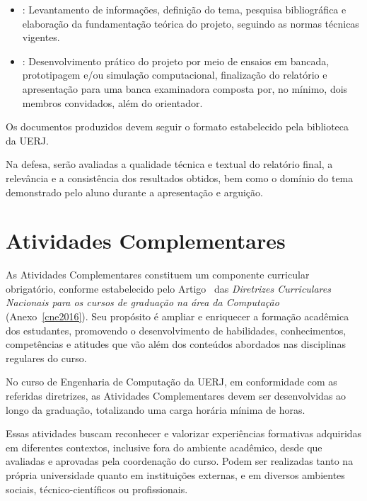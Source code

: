 \begin{itemize}
    \item \textbf{\ProjA}: Levantamento de informações, definição do tema, pesquisa bibliográfica e elaboração da fundamentação teórica do projeto, seguindo as normas técnicas vigentes.
    \item \textbf{\ProjB}: Desenvolvimento prático do projeto por meio de ensaios em bancada, prototipagem e/ou simulação computacional, finalização do relatório e apresentação para uma banca examinadora composta por, no mínimo, dois membros convidados, além do orientador.
\end{itemize}

Os documentos produzidos devem seguir o formato estabelecido pela biblioteca da UERJ.

Na defesa, serão avaliadas a qualidade técnica e textual do relatório final, a relevância e a consistência dos resultados obtidos, bem como o domínio do tema demonstrado pelo aluno durante a apresentação e arguição.


\section{Atividades Complementares}

As Atividades Complementares constituem um componente curricular obrigatório, conforme estabelecido pelo Artigo~ das \textit{Diretrizes Curriculares Nacionais para os cursos de graduação na área da Computação} (Anexo~\ref{cne2016}). Seu propósito é ampliar e enriquecer a formação acadêmica dos estudantes, promovendo o desenvolvimento de habilidades, conhecimentos, competências e atitudes que vão além dos conteúdos abordados nas disciplinas regulares do curso.

No curso de Engenharia de Computação da UERJ, em conformidade com as referidas diretrizes, as Atividades Complementares devem ser desenvolvidas ao longo da graduação, totalizando uma carga horária mínima de \hACC horas.

Essas atividades buscam reconhecer e valorizar experiências formativas adquiridas em diferentes contextos, inclusive fora do ambiente acadêmico, desde que avaliadas e aprovadas pela coordenação do curso. Podem ser realizadas tanto na própria universidade quanto em instituições externas, e em diversos ambientes sociais, técnico-científicos ou profissionais.

